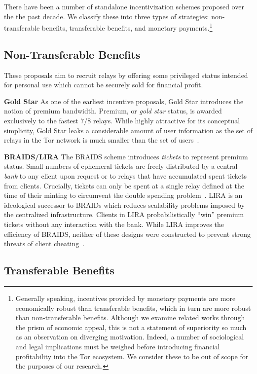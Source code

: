There have been a number of standalone incentivization schemes proposed over the
the past decade. We classify these into three types of strategies:
non-transferable benefits, transferable benefits, and monetary
payments.\footnote{Generally speaking, incentives provided by monetary payments
  are more economically robust than transferable benefits, which in turn are
  more robust than non-transferable benefits. Although we examine related works
  through the prism of economic appeal, this is not a statement of superiority
  so much as an observation on diverging motivation. Indeed, a number of
  sociological and legal implications must be weighed before
  introducing financial profitability into the Tor ecosystem. We consider these
  to be out of scope for the purposes of our research.}

\subsection{Non-Transferable Benefits}

These proposals aim to recruit relays by offering some privileged status
intended for personal use which cannot be securely sold for financial profit.

\textbf{Gold Star} As one of the earliest incentive proposals, Gold Star
introduces the notion of premium bandwidth. Premium, or \emph{gold star} status,
is awarded exclusively to the fastest 7/8 relays. While highly attractive
for its conceptual simplicity, Gold Star leaks a considerable amount of user
information as the set of relays in the Tor network is much smaller than the set
of users~\cite{dingledine2010building}.

\textbf{BRAIDS/LIRA} The BRAIDS scheme introduces \emph{tickets} to represent
premium status. Small numbers of ephemeral tickets are freely distributed by a
central \emph{bank} to any client upon request or to relays that have
accumulated spent tickets from clients. Crucially, tickets can only be spent at
a single relay defined at the time of their minting to circumvent the double
spending problem~\cite{jansen2010recruiting}. LIRA is an ideological successor
to BRAIDs which reduces scalability problems imposed by the centralized
infrastructure. Clients in LIRA probabilistically ``win'' premium tickets
without any interaction with the bank. While LIRA improves the efficiency of
BRAIDS, neither of these designs were constructed to prevent strong threats of
client cheating~\cite{jansen2013lira}.

\subsection{Transferable Benefits}

